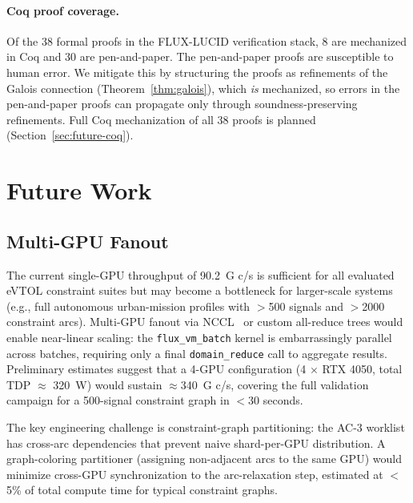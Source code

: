 \documentclass[sigplan,review,anonymous]{acmart}
\begin{document}
{\paragraph{Coq proof coverage.}
Of the 38 formal proofs in the FLUX-LUCID verification stack, 8 are
mechanized in Coq and 30 are pen-and-paper. The pen-and-paper proofs
are susceptible to human error. We mitigate this by structuring the
proofs as refinements of the Galois connection (Theorem~\ref{thm:galois}),
which \emph{is} mechanized, so errors in the pen-and-paper proofs can
propagate only through soundness-preserving refinements. Full Coq
mechanization of all 38 proofs is planned (Section~\ref{sec:future-coq}).


\section{Future Work}
\label{sec:future}

\subsection{Multi-GPU Fanout}
\label{sec:future-multigpu}

The current single-GPU throughput of 90.2~G c/s is sufficient for all
evaluated eVTOL constraint suites but may become a bottleneck for
larger-scale systems (e.g., full autonomous urban-mission profiles with
$>$500 signals and $>$2000 constraint arcs). Multi-GPU fanout via
NCCL~\cite{nccl} or custom all-reduce trees would enable near-linear
scaling: the \texttt{flux\_vm\_batch} kernel is embarrassingly parallel
across batches, requiring only a final \texttt{domain\_reduce} call to
aggregate results. Preliminary estimates suggest that a 4-GPU configuration
(4 $\times$ RTX 4050, total TDP $\approx$ 320~W) would sustain
$\approx$340~G c/s, covering the full validation campaign for a
500-signal constraint graph in $<$30 seconds.

The key engineering challenge is constraint-graph partitioning: the
AC-3 worklist has cross-arc dependencies that prevent naive
shard-per-GPU distribution. A graph-coloring partitioner (assigning
non-adjacent arcs to the same GPU) would minimize cross-GPU
synchronization to the arc-relaxation step, estimated at $<$5\% of
total compute time for typical constraint graphs.

}
\end{document}
